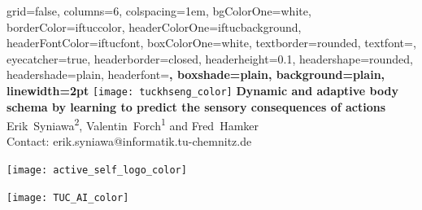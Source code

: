 \documentclass[portrait,final,a0paper,fontscale=0.33]{baposter}
\begin{document}
\begin{poster}%
	{
		grid=false,
		columns=6,
		colspacing=1em,
		bgColorOne=white,
		borderColor=iftuccolor,
		headerColorOne=iftucbackground,
		headerFontColor=iftucfont,
		boxColorOne=white,
		textborder=rounded,
		textfont=\small,
		eyecatcher=true,
		headerborder=closed,
		headerheight=0.1\textheight,
		headershape=rounded,
		headershade=plain,
		headerfont=\Large\bf, %
		boxshade=plain,
		background=plain,
		linewidth=2pt
	}
	{\texttt{[image: tuckhseng\_color]}} 
	{\bf\Large{Dynamic and adaptive body schema by learning to predict the sensory consequences of actions}\vspace{1em}}
	{\large Erik~Syniawa\textsuperscript{2}, Valentin~Forch\textsuperscript{1} and Fred~Hamker \\ \vspace{0.5em}
	\small Contact: erik.syniawa@informatik.tu-chemnitz.de
	}
	{	
		\begin{minipage}[r]{0.1\textwidth}
			\texttt{[image: active\_self\_logo\_color]}
		\end{minipage}
		\hfill
		\begin{minipage}[r]{0.1\textwidth}
			\texttt{[image: TUC\_AI\_color]}
		\end{minipage}
		
	}

\end{poster}
\end{document}
